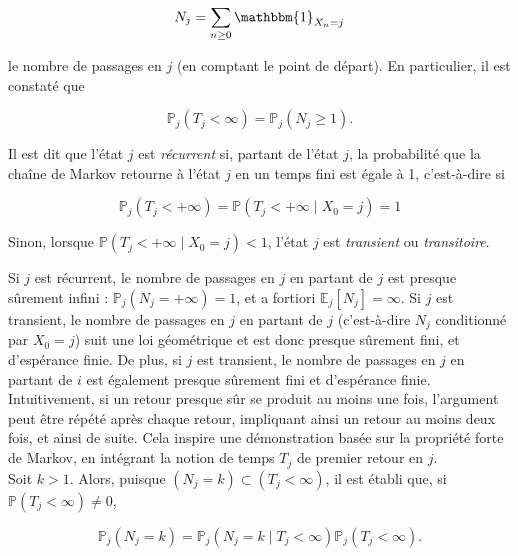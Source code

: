 \begin{sloppypar}
\begin{equation}
N_j = \sum_{n \geq 0} \mathbbm{1}_{X_n = j} 
\end{equation}

le nombre de passages en $j$ (en comptant le point de départ). En particulier, il est constaté que 

\begin{equation}
\mathbb{P}_j(T_j < \infty) = \mathbb{P}_j(N_j \geq 1).   
\end{equation}

\begin{tcolorbox}[colback=blue!5!white,colframe=blue!75!black,title=Définition]
Il est dit que l'état $j$ est \emph{récurrent} si, partant de l’état $j$, la probabilité que la chaîne de Markov retourne à l’état $j$ en un temps fini est égale à 1, c’est-à-dire si 

\begin{equation}
\mathbb{P}_j(T_j < +\infty) = \mathbb{P}(T_j < +\infty \mid X_0 = j) = 1    
\end{equation}

Sinon, lorsque $\mathbb{P}(T_j < +\infty \mid X_0 = j) < 1$, l'état $j$ est \emph{transient} ou \emph{transitoire}.
\end{tcolorbox}


Si $j$ est récurrent, le nombre de passages en $j$ en partant de $j$ est presque sûrement
infini : $\mathbb{P}_j(N_j = +\infty) = 1$, et a fortiori $\mathbb{E}_j[N_j] = \infty$. Si $j$ est transient, le nombre de passages en $j$ en partant de $j$ (c’est-à-dire $N_j$ conditionné par $X_0 = j$)
suit une loi géométrique et est donc presque sûrement fini, et d’espérance finie. De plus, si $j$ est transient, le nombre de passages en $j$ en partant de $i$ est également presque sûrement fini et
d’espérance finie.\\

Intuitivement, si un retour presque sûr se produit au moins une fois, l'argument peut être répété après chaque retour, impliquant ainsi un retour au moins deux fois, et ainsi de suite. Cela inspire une démonstration basée sur la propriété forte de Markov, en intégrant la notion de temps
$T_j$ de premier retour en $j$.\\

Soit $k > 1$. Alors, puisque $(N_j = k) \subset (T_j < \infty)$, il est établi que, si $\mathbb{P}(T_j < \infty) \neq 0$,

\begin{equation}
    \mathbb{P}_j(N_j = k) = \mathbb{P}_j(N_j = k \mid T_j < \infty) \mathbb{P}_j(T_j < \infty).  
\end{equation}


\end{sloppypar}
